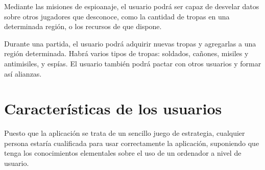 Mediante las misiones de espioanaje, el usuario podrá ser capaz de desvelar
datos sobre otros jugadores que desconoce, como la cantidad de tropas en una
determinada región, o los recursos de que dispone.

Durante una partida, el usuario podrá adquirir nuevas tropas y agregarlas a una
región determinada. Habrá varios tipos de tropas: soldados, cañones, misiles y
antimisiles, y espías. El usuario también podrá pactar con otros usuarios y
formar así alianzas.

\section{Características de los usuarios}

Puesto que la aplicación se trata de un sencillo juego de estrategia, cualquier
persona estaría cualificada para usar correctamente la aplicación, suponiendo
que tenga los conocimientos elementales sobre el uso de un ordenador a nivel de
usuario.
